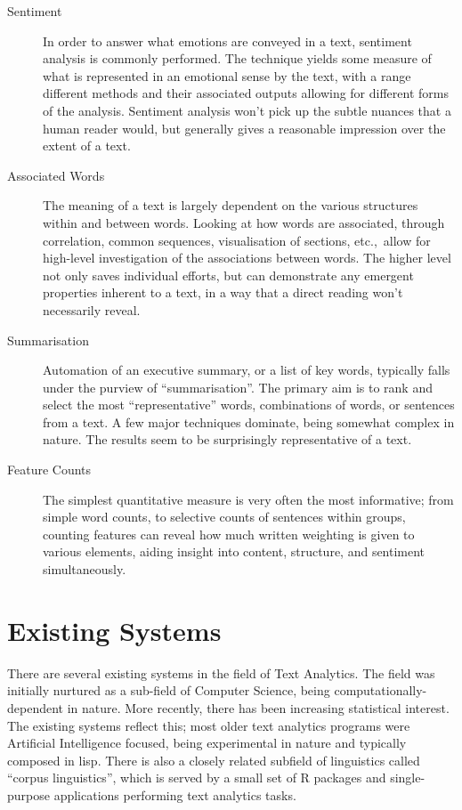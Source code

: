 \documentclass[11pt, a4paper, titlepage]{report}
\begin{document}
\begin{description}
\item[Sentiment] In order to answer what emotions are conveyed in a
  text, sentiment analysis is commonly performed. The technique yields
  some measure of what is represented in an emotional sense by the
  text, with a range different methods and their associated outputs
  allowing for different forms of the analysis. Sentiment analysis
  won't pick up the subtle nuances that a human reader would, but
  generally gives a reasonable impression over the extent of a text.
\item[Associated Words] The meaning of a text is largely dependent on
  the various structures within and between words. Looking at how
  words are associated, through correlation, common sequences,
  visualisation of sections, etc.,\ allow for high-level investigation
  of the associations between words. The higher level not only saves
  individual efforts, but can demonstrate any emergent properties
  inherent to a text, in a way that a direct reading won't necessarily
  reveal.
\item[Summarisation] Automation of an executive summary, or a list of
  key words, typically falls under the purview of ``summarisation''.
  The primary aim is to rank and select the most ``representative''
  words, combinations of words, or sentences from a text. A few major
  techniques dominate, being somewhat complex in nature. The results
  seem to be surprisingly representative of a text.
\item[Feature Counts] The simplest quantitative measure is very often
  the most informative; from simple word counts, to selective counts
  of sentences within groups, counting features can reveal how much
  written weighting is given to various elements, aiding insight into
  content, structure, and sentiment simultaneously.
\end{description}

\section{Existing Systems}

There are several existing systems in the field of Text Analytics. The
field was initially nurtured as a sub-field of Computer Science, being
computationally-dependent in nature. More recently, there has been
increasing statistical interest. The existing systems reflect this;
most older text analytics programs were Artificial Intelligence
focused, being experimental in nature and typically composed in lisp.
There is also a closely related subfield of linguistics called
``corpus linguistics'', which is served by a small set of R packages
and single-purpose applications performing text analytics
tasks\autocite{desagulier17:_corpus_linguis_statis_r}.
\end{document}
